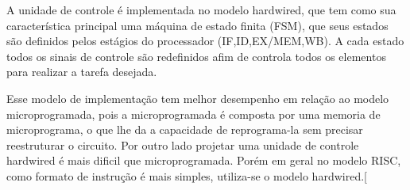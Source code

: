 \documentclass{report}
\begin{document}
A unidade de controle é implementada no modelo hardwired, que tem como sua característica principal uma máquina de estado finita (FSM), que seus estados são definidos pelos estágios do processador (IF,ID,EX/MEM,WB). A cada estado todos os sinais de controle são redefinidos afim de controla todos os elementos para realizar a tarefa desejada.

Esse modelo de implementação tem melhor desempenho em relação ao modelo microprogramada, pois a microprogramada é composta por uma memoria de microprograma, o que lhe da a capacidade de reprograma-la sem precisar reestruturar o circuito. Por outro lado projetar uma unidade de controle hardwired é mais dificil que microprogramada. Porém em geral no modelo RISC, como formato de instrução é mais simples, utiliza-se o modelo hardwired.[

\end{document}
